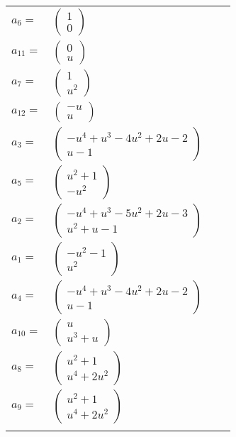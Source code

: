 \documentclass[1p]{elsarticle_modified}
\theoremstyle{definition}
\begin{document}
\begin{tabular}{m{7pt} m{180pt} m{7pt} m{180pt} }
\flushright $a_{6}=$&$\begin{pmatrix}1\\0\end{pmatrix}$ \\
\flushright $a_{11}=$&$\begin{pmatrix}0\\u\end{pmatrix}$ \\
\flushright $a_{7}=$&$\begin{pmatrix}1\\u^2\end{pmatrix}$ \\
\flushright $a_{12}=$&$\begin{pmatrix}- u\\u\end{pmatrix}$ \\
\flushright $a_{3}=$&$\begin{pmatrix}- u^4+u^3-4 u^2+2 u-2\\u-1\end{pmatrix}$ \\
\flushright $a_{5}=$&$\begin{pmatrix}u^2+1\\- u^2\end{pmatrix}$ \\
\flushright $a_{2}=$&$\begin{pmatrix}- u^4+u^3-5 u^2+2 u-3\\u^2+u-1\end{pmatrix}$ \\
\flushright $a_{1}=$&$\begin{pmatrix}- u^2-1\\u^2\end{pmatrix}$ \\
\flushright $a_{4}=$&$\begin{pmatrix}- u^4+u^3-4 u^2+2 u-2\\u-1\end{pmatrix}$ \\
\flushright $a_{10}=$&$\begin{pmatrix}u\\u^3+u\end{pmatrix}$ \\
\flushright $a_{8}=$&$\begin{pmatrix}u^2+1\\u^4+2 u^2\end{pmatrix}$ \\
\flushright $a_{9}=$&$\begin{pmatrix}u^2+1\\u^4+2 u^2\end{pmatrix}$\\&\end{tabular}
\end{document}
